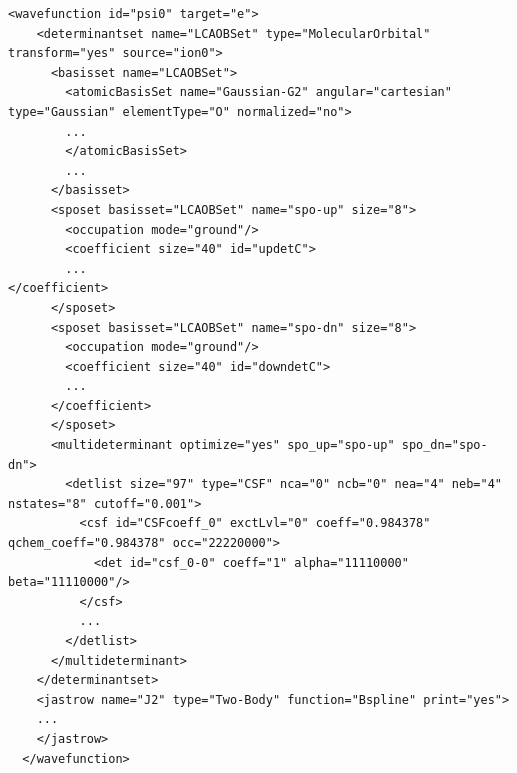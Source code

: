 {\begin{lstlisting}[style=QMCPXML,caption=``Basic framework for a multideterminant determinantset XML block.",label=lam_xml_multideterminant]
  <wavefunction id="psi0" target="e">
    <determinantset name="LCAOBSet" type="MolecularOrbital" transform="yes" source="ion0">
      <basisset name="LCAOBSet">
        <atomicBasisSet name="Gaussian-G2" angular="cartesian" type="Gaussian" elementType="O" normalized="no">
        ...
        </atomicBasisSet>
        ...
      </basisset>
      <sposet basisset="LCAOBSet" name="spo-up" size="8">
        <occupation mode="ground"/>
        <coefficient size="40" id="updetC">
        ...
</coefficient>
      </sposet>
      <sposet basisset="LCAOBSet" name="spo-dn" size="8">
        <occupation mode="ground"/>
        <coefficient size="40" id="downdetC">
        ...
      </coefficient>
      </sposet>
      <multideterminant optimize="yes" spo_up="spo-up" spo_dn="spo-dn">
        <detlist size="97" type="CSF" nca="0" ncb="0" nea="4" neb="4" nstates="8" cutoff="0.001">
          <csf id="CSFcoeff_0" exctLvl="0" coeff="0.984378" qchem_coeff="0.984378" occ="22220000">
            <det id="csf_0-0" coeff="1" alpha="11110000" beta="11110000"/>
          </csf>
          ...
        </detlist>
      </multideterminant>
    </determinantset>
    <jastrow name="J2" type="Two-Body" function="Bspline" print="yes">
    ...
    </jastrow>
  </wavefunction>
\end{lstlisting}

}
